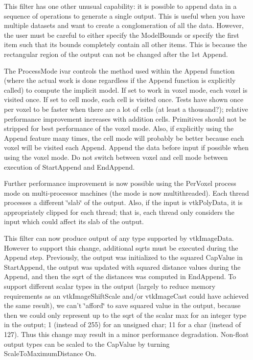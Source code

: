 This filter has one other unusual capability\-: it is possible to append data in a sequence of operations to generate a single output. This is useful when you have multiple datasets and want to create a conglomeration of all the data. However, the user must be careful to either specify the Model\-Bounds or specify the first item such that its bounds completely contain all other items. This is because the rectangular region of the output can not be changed after the 1st Append. 

The Process\-Mode ivar controls the method used within the Append function (where the actual work is done regardless if the Append function is explicitly called) to compute the implicit model. If set to work in voxel mode, each voxel is visited once. If set to cell mode, each cell is visited once. Tests have shown once per voxel to be faster when there are a lot of cells (at least a thousand?); relative performance improvement increases with addition cells. Primitives should not be stripped for best performance of the voxel mode. Also, if explicitly using the Append feature many times, the cell mode will probably be better because each voxel will be visited each Append. Append the data before input if possible when using the voxel mode. Do not switch between voxel and cell mode between execution of Start\-Append and End\-Append. 

Further performance improvement is now possible using the Per\-Voxel process mode on multi-\/processor machines (the mode is now multithreaded). Each thread processes a different \char`\"{}slab\char`\"{} of the output. Also, if the input is vtk\-Poly\-Data, it is appropriately clipped for each thread; that is, each thread only considers the input which could affect its slab of the output. 

This filter can now produce output of any type supported by vtk\-Image\-Data. However to support this change, additional sqrts must be executed during the Append step. Previously, the output was initialized to the squared Cap\-Value in Start\-Append, the output was updated with squared distance values during the Append, and then the sqrt of the distances was computed in End\-Append. To support different scalar types in the output (largely to reduce memory requirements as an vtk\-Image\-Shift\-Scale and/or vtk\-Image\-Cast could have achieved the same result), we can't \char`\"{}afford\char`\"{} to save squared value in the output, because then we could only represent up to the sqrt of the scalar max for an integer type in the output; 1 (instead of 255) for an unsigned char; 11 for a char (instead of 127). Thus this change may result in a minor performance degradation. Non-\/float output types can be scaled to the Cap\-Value by turning Scale\-To\-Maximum\-Distance On.

